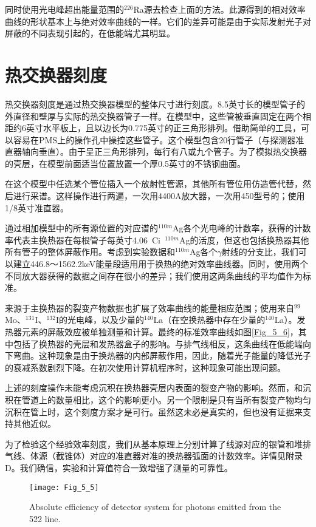 同时使用光电峰超出能量范围的$^{226}$Ra源去检查上面的方法。此源得到的相对效率曲线的形状基本上与绝对效率曲线的一样。它们的差异可能是由于实际发射光子对屏蔽的不同表现引起的，在低能端尤其明显。


\section{热交换器刻度}\label{section:5_5}

热交换器刻度是通过热交换器模型的整体尺寸进行刻度。8.5英寸长的模型管子的外直径和壁厚与实际的热交换器管子一样。在模型中，这些管被垂直固定在两个相距约6英寸水平板上，且以边长为0.775英寸的正三角形排列。借助简单的工具，可以容易在PMS上的操作孔中操控这些管子。这个模型包含20行管子（与探测器准直器轴向垂直）。由于呈正三角形排列，每行有八或九个管子。为了模拟热交换器的壳层，在模型前面适当位置放置一个厚0.5英寸的不锈钢曲面。

在这个模型中任选某个管位插入一个放射性管源，其他所有管位用仿造管代替，然后进行采谱。这样操作进行两遍，一次用4400A放大器，一次用450型号的；使用1/8英寸准直器。

通过相加模型中的所有源位置的对应谱的$^{110m}$Ag各个光电峰的计数率，获得的计数率代表主换热器在每根管子每英寸4.06\ Ci\ $^{110m}$Ag的活度，但这也包括换热器其他所有管子的整体屏蔽作用。考虑到实验数据和$^{110m}$Ag各个$\gamma$射线的分支比，我们可以建立446.8～1562.2keV能量段适用用于换热的绝对效率曲线器。同时，使用两个不同放大器获得的数据之间存在很小的差异；我们使用这两条曲线的平均值作为标准。

来源于主换热器的裂变产物数据也扩展了效率曲线的能量相应范围；使用来自$^{99}$Mo、$^{131}$I、$^{132}$I的光电峰，以及少量的$^{140}$La（在空换热器中存在少量的$^{140}$La）。发热器元素的屏蔽效应被单独测量和计算。最终的标准效率曲线如图\ref{Fig_5_6}，其中包括了换热器的壳层和发热器盒子的影响。与排气线相反，这条曲线在低能端向下弯曲。这种现象是由于换热器的内部屏蔽作用，因此，随着光子能量的降低光子的衰减系数剧烈下降。在初次使用计算机程序时，这种现象可能出现问题。

上述的刻度操作未能考虑沉积在换热器壳层内表面的裂变产物的影响。然而，和沉积在管道上的数量相比，这个的影响更小。另一个限制是只有当所有裂变产物均匀沉积在管上时，这个刻度方案才是可行。虽然这未必是真实的，但也没有证据来支持其他近似。

为了检验这个经验效率刻度，我们从基本原理上分别计算了线源对应的银管和堆排气线、体源（截锥体）对应的准直器对准的换热器弧面的计数效率。详情见附录D。我们确信，实验和计算值符合一致增强了测量的可靠性。

\begin{figure}
\centering
\texttt{[image: Fig\_5\_5]}
\caption{Absolute efficiency of detector system for photons emitted from the 522 line.}
\label{Fig_5_5}
\end{figure}

